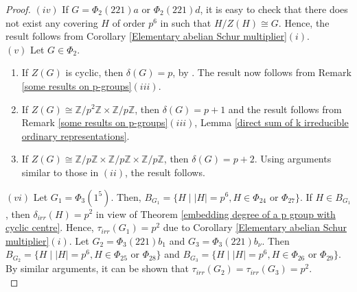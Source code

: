 \documentclass[a4paper,11pt]{amsart}
\numberwithin{equation}{section}
\numberwithin{equation}{subsection}
\newcommand{\Z}{\mathbb{Z}}
\newcommand{\poonam}[1]{{\color{blue} #1}}
\begin{document}
\begin{proof}

$(iv)$ If $G= \Phi_{2}(221)a$ or $\Phi_{2}(221)d$, it is easy to check that there does not exist any covering $H$ of order $p^6$ in \cite[Table 4.1]{james} such that $H/Z(H) \cong G$. Hence, the result follows from Corollary \ref{Elementary abelian Schur multiplier}$(i)$. \\ 

$(v)$ Let $G \in \Phi_2$. 
\begin{enumerate}[label=(\alph*)]
	\item If $Z(G)$ is cyclic, then $\delta(G)= p$, by \cite[Theorem 3.1(4)(i)]{kaur}. The result now follows from Remark \ref{some results on p-groups}$(iii)$. 
	\item  If $Z(G) \cong \Z/p^{2}\Z \times \Z/p\Z$, then $\delta(G)= p+1$ and the result follows from Remark \ref{some results on p-groups}$(iii)$, Lemma \ref{direct sum of k irreducible ordinary representations}. %
	\item If $Z(G) \cong \Z/p\Z \times \Z/p\Z \times \Z/p\Z$, then $\delta(G)= p+2$. Using arguments similar to those in $(ii)$, the result follows. 
\end{enumerate}

$(vi)$  Let $G_1 = \Phi_{3}(1^{5})$. Then, $B_{G_1}= \{H \mid  |H|= p^6, H \in \Phi_{24} \text{ or } \Phi_{27}\}$. If $H \in B_{G_1}$, then $\delta_{irr}(H)= p^2$ in view of Theorem \ref{embedding degree of a p group with cyclic centre}. Hence, $\tau_{irr}(G_1)= p^2$ due to Corollary \ref{Elementary abelian Schur multiplier}$(i)$.
Let $G_2 = \Phi_{3}(221)b_{1}$ and $G_3 = \Phi_{3}(221)b_{\nu}$. Then $B_{G_2}= \{H \mid |H|= p^6, H \in \Phi_{25} \text{ or } \Phi_{28}\}$ and $B_{G_3}= \{H \mid |H|= p^6, H \in \Phi_{26} \text{ or } \Phi_{29} \}$.
By similar arguments, it can be shown that $\tau_{irr}(G_2)=\tau_{irr}(G_3)= p^2$. \\




\end{proof}
\end{document}
